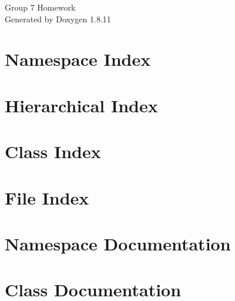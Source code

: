\documentclass[twoside]{book}
\newcommand{\+}{\discretionary{\mbox{\scriptsize$\hookleftarrow$}}{}{}}
\newcommand{\clearemptydoublepage}{%
  \newpage{\pagestyle{empty}\cleardoublepage}%
}
\begin{document}
\hypersetup{pageanchor=false,
             bookmarksnumbered=true,
             pdfencoding=unicode
            }
\begin{titlepage}
\vspace*{7cm}
\begin{center}%
{\Large Group 7 Homework }\\
\vspace*{1cm}
{\large Generated by Doxygen 1.8.11}\\
\end{center}
\end{titlepage}
\clearemptydoublepage
\tableofcontents
\clearemptydoublepage
{}
\hypersetup{pageanchor=true}

\chapter{Namespace Index}

\chapter{Hierarchical Index}

\chapter{Class Index}

\chapter{File Index}

\chapter{Namespace Documentation}










\chapter{Class Documentation}















\end{document}

